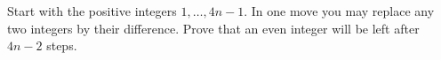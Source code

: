 Start with the positive integers $1, \ldots, 4n - 1$. In one move you may replace any two integers by their difference. Prove that an even integer will be left after $4n - 2$ steps.
